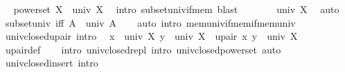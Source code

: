 \begin{isabellebody}
\ \isamarkupfalse%
\ {\isachardoublequoteopen}powerset\ X\ {\isasymsubseteq}\ univ\ X{\isachardoublequoteclose}\ \isamarkupfalse%
\ {\isacharparenleft}{\kern0pt}intro\ subset{\isacharunderscore}{\kern0pt}univ{\isacharunderscore}{\kern0pt}if{\isacharunderscore}{\kern0pt}mem{\isacharparenright}{\kern0pt}\ blast\isanewline
\ \ \isamarkupfalse%
\ \isamarkupfalse%
\ {\isachardoublequoteopen}{\isacharbraceleft}{\kern0pt}{\isacharbraceright}{\kern0pt}\ {\isasymin}\ univ\ X{\isachardoublequoteclose}\ \isamarkupfalse%
\ auto\isanewline
{}\isamarkupfalse%
%
\endisatagproof
{\isafoldproof}%
%
\isadelimproof
\isanewline
%
\endisadelimproof
\isanewline
{}\isamarkupfalse%
\ subset{\isacharunderscore}{\kern0pt}univ\ {\isacharbrackleft}{\kern0pt}iff{\isacharbrackright}{\kern0pt}{\isacharcolon}{\kern0pt}\ {\isachardoublequoteopen}A\ {\isasymsubseteq}\ univ\ A{\isachardoublequoteclose}\isanewline
%
\isadelimproof
\ \ %
\endisadelimproof
%
\isatagproof
{}\isamarkupfalse%
\ {\isacharparenleft}{\kern0pt}auto\ intro{\isacharcolon}{\kern0pt}\ mem{\isacharunderscore}{\kern0pt}univ{\isacharunderscore}{\kern0pt}if{\isacharunderscore}{\kern0pt}mem{\isacharunderscore}{\kern0pt}if{\isacharunderscore}{\kern0pt}mem{\isacharunderscore}{\kern0pt}univ{\isacharparenright}{\kern0pt}%
\endisatagproof
{\isafoldproof}%
%
\isadelimproof
\isanewline
%
\endisadelimproof
\isanewline
{}\isamarkupfalse%
\ univ{\isacharunderscore}{\kern0pt}closed{\isacharunderscore}{\kern0pt}upair\ {\isacharbrackleft}{\kern0pt}intro{\isacharbang}{\kern0pt}{\isacharbrackright}{\kern0pt}{\isacharcolon}{\kern0pt}\isanewline
\ \ {\isachardoublequoteopen}{\isasymlbrakk}x\ {\isasymin}\ univ\ X{\isacharsemicolon}{\kern0pt}\ y\ {\isasymin}\ univ\ X{\isasymrbrakk}\ {\isasymLongrightarrow}\ upair\ x\ y\ {\isasymin}\ univ\ X{\isachardoublequoteclose}\isanewline
%
\isadelimproof
\ \ %
\endisadelimproof
%
\isatagproof
{}\isamarkupfalse%
\ upair{\isacharunderscore}{\kern0pt}def\isanewline
\ \ \isamarkupfalse%
\ {\isacharparenleft}{\kern0pt}intro\ univ{\isacharunderscore}{\kern0pt}closed{\isacharunderscore}{\kern0pt}repl{\isacharcomma}{\kern0pt}\ intro\ univ{\isacharunderscore}{\kern0pt}closed{\isacharunderscore}{\kern0pt}powerset{\isacharparenright}{\kern0pt}\ auto%
\endisatagproof
{\isafoldproof}%
%
\isadelimproof
\isanewline
%
\endisadelimproof
\isanewline
{}\isamarkupfalse%
\ univ{\isacharunderscore}{\kern0pt}closed{\isacharunderscore}{\kern0pt}insert\ {\isacharbrackleft}{\kern0pt}intro{\isacharbang}{\kern0pt}{\isacharbrackright}{\kern0pt}{\isacharcolon}{\kern0pt}\isanewline

\end{isabellebody}
